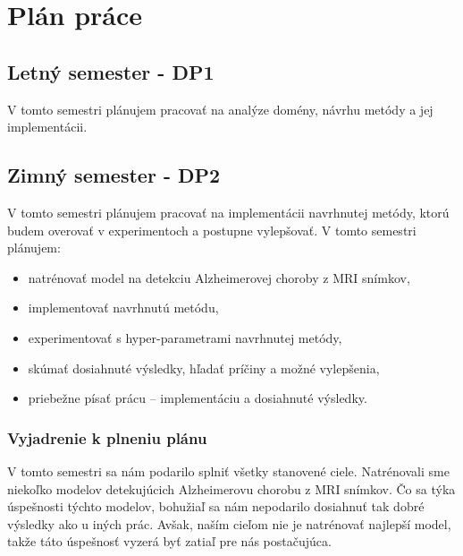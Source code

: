 \chapter{Plán práce \label{cha:plan}}

\setcounter{page}{1}

\section{Letný semester - DP1}

V tomto semestri plánujem pracovať na analýze domény, návrhu metódy a jej implementácii.

\section{Zimný semester - DP2}

    
    V tomto semestri plánujem pracovať na implementácii navrhnutej metódy, ktorú budem overovať v experimentoch a postupne vylepšovať. V tomto semestri plánujem:
    
    \begin{itemize}
        \item natrénovať model na detekciu Alzheimerovej choroby z MRI snímkov,
        \item implementovať navrhnutú metódu,
        \item experimentovať s hyper-parametrami navrhnutej metódy,
        \item skúmať dosiahnuté výsledky, hľadať príčiny a možné vylepšenia,
        \item priebežne písať prácu -- implementáciu a dosiahnuté výsledky.
    \end{itemize}

    \subsection{Vyjadrenie k plneniu plánu}

    V tomto semestri sa nám podarilo splniť všetky stanovené ciele. Natrénovali sme niekoľko modelov detekujúcich Alzheimerovu chorobu z MRI snímkov. Čo sa týka úspešnosti týchto modelov, bohužiaľ sa nám nepodarilo dosiahnuť tak dobré výsledky ako u iných prác. Avšak, naším cieľom nie je natrénovať najlepší model, takže táto úspešnosť vyzerá byť zatiaľ pre nás postačujúca. 


